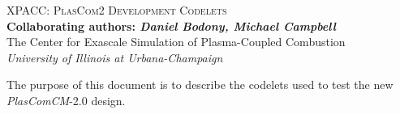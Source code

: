 \documentclass[11pt]{article}
\newcommand{\cPI}[1]{\textbf{\color{myBrown}#1}}
\newcommand{\dancode}{\emph{PlasComCM}}
\begin{document}
\pagestyle{empty}

\begin{center}
\vspace*{1.5in}

\textsc{\color{myBrown} \huge XPACC: PlasCom2 Development Codelets} \\
\bigskip
\cPI{Collaborating authors: {\itshape Daniel Bodony, Michael Campbell}} \\
\medskip
{\color{myTan} The Center for Exascale Simulation of Plasma-Coupled Combustion} \\
{\color{myTan} \textit{University of Illinois at Urbana-Champaign}} \\

\vfil
\begin{minipage}{0.8\textwidth}

The purpose of this document is to describe the codelets used to test the new \dancode-2.0 design.

\end{minipage}

\vfil
\end{center}


\newpage
\setcounter{page}{1}
\pagestyle{plain}


\newpage
\end{document}
